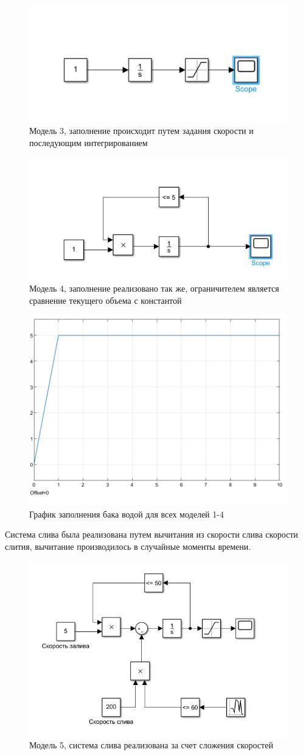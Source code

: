 \documentclass{article}
\begin{document}
	\begin{figure}[H]
		\centering
		\includegraphics[width=0.7\linewidth]{model3}
		\caption{Модель 3, заполнение происходит путем задания скорости и последующим интегрированием}
	\end{figure}
	\begin{figure}[H]
		\centering
		\includegraphics[width=0.7\linewidth]{model4}
		\caption{Модель 4, заполнение реализовано так же, ограничителем является сравнение текущего объема с константой}
	\end{figure}
	\begin{figure}[H]
		\centering
		\includegraphics[width=0.7\linewidth]{Graph_1}
		\caption{График заполнения бака водой для всех моделей 1-4}
	\end{figure}
	Система слива была реализована путем вычитания из скорости слива скорости слития, вычитание производилось в случайные моменты времени.
	\begin{figure}[H]
		\centering
		\includegraphics[width=0.7\linewidth]{model5}
		\caption{Модель 5, система слива реализована за счет сложения скоростей}
	\end{figure}
\end{document}
